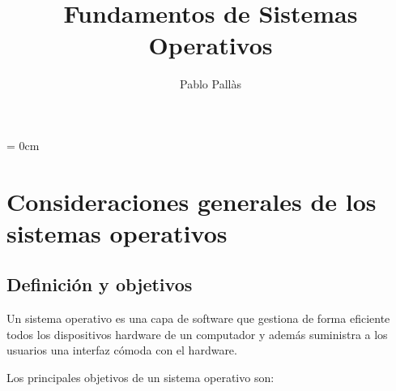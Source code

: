 \documentclass[12pt]{article}
\author{Pablo Pallàs}
\title{Fundamentos de Sistemas Operativos}
\begin{document}
\rmfamily
\maketitle
\vspace{2.5cm}
\tableofcontents
\parindent= 0cm
\newpage
\section{Consideraciones generales de los sistemas operativos}
\subsection{Definición y objetivos}


Un sistema operativo es una capa de software que gestiona de forma eficiente todos los dispositivos
hardware de un computador y además suministra a los usuarios una interfaz cómoda con el hardware.

Los principales objetivos de un sistema operativo son: 
\end{document}
